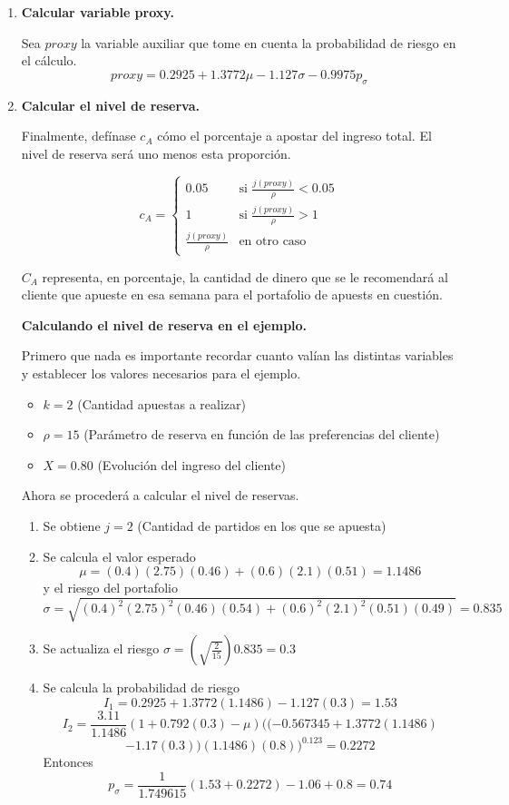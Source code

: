 \begin{enumerate}
	
	\item \textbf{Calcular variable proxy.}
	
	 Sea $proxy$ la variable auxiliar que tome en cuenta la probabilidad de riesgo en el cálculo.
	 \[proxy = 0.2925 + 1.3772\mu -1.127\sigma - 0.9975p_\sigma\]
	
	\item \textbf{Calcular el nivel de reserva.}
	
	Finalmente, defínase $c_A$ cómo el porcentaje a apostar del ingreso total. El nivel de reserva será uno menos esta proporción.
	
	\begin{equation*}
	    c_A = \begin{cases}
	               0.05            & \text{si } \frac{j(proxy)}{\rho} < 0.05\\
	               1               & \text{si } \frac{j(proxy)}{\rho} >1\\
	              	\frac{j(proxy)}{\rho} & \text{en otro caso}
	           \end{cases}
	\end{equation*}
	
	$C_A$ representa, en porcentaje, la cantidad de dinero que se le recomendará al cliente que apueste en esa semana para el portafolio de apuests en cuestión.
	
	\textbf{Calculando el nivel de reserva en el ejemplo.}
	
	Primero que nada es importante recordar cuanto valían las distintas variables y establecer los valores necesarios para el ejemplo.
	\begin{itemize}
		\item $k = 2$ (Cantidad apuestas a realizar)
		\item $\rho = 15$ (Parámetro de reserva en función de las preferencias del cliente)
		\item $X = 0.80$ (Evolución del ingreso del cliente)		
	\end{itemize}
	Ahora se procederá a calcular el nivel de reservas.
	\begin{enumerate}
		\item Se obtiene $j = 2$ (Cantidad de partidos en los que se apuesta)
		\item Se calcula el valor esperado 
		\[\mu = (0.4)(2.75)(0.46) + (0.6)(2.1)(0.51) = 1.1486\] 
		y el riesgo del portafolio 
		\[\sigma = \sqrt{(0.4)^2(2.75)^2(0.46)(0.54)+(0.6)^2(2.1)^2(0.51)(0.49)} = 0.835\]
		\item Se actualiza el riesgo $\sigma = \left(\sqrt{\frac{2}{15}}\right)0.835 = 0.3$
		\item Se calcula la probabilidad de riesgo
		\[I_1 = 0.2925 +1.3772(1.1486) - 1.127(0.3) = 1.53\]
		\[I_2 = \frac{3.11}{1.1486}(1 + 0.792(0.3) - \mu)((-0.567345 + 1.3772(1.1486)\]
		\[-1.17(0.3))(1.1486)(0.8))^{0.123} = 0.2272\]
		Entonces
		\[p_\sigma = \frac{1}{1.749615}(1.53 + 0.2272) - 1.06 + 0.8 = 0.74\]
		

\end{enumerate}
\end{enumerate}
